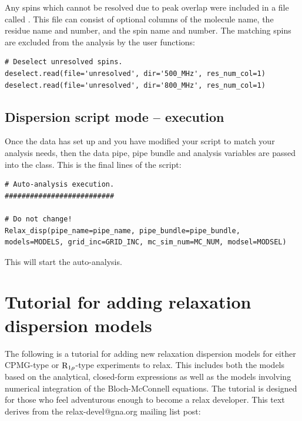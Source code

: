 Any spins which cannot be resolved due to peak overlap were included in a file called .  This file can consist of optional columns of the molecule name, the residue name and number, and the spin name and number.  The matching spins are excluded from the analysis by the user functions:

\begin{lstlisting}[firstnumber=113]
# Deselect unresolved spins.
deselect.read(file='unresolved', dir='500_MHz', res_num_col=1)
deselect.read(file='unresolved', dir='800_MHz', res_num_col=1)
\end{lstlisting}


\subsection{Dispersion script mode -- execution}

Once the data has set up and you have modified your script to match your analysis needs, then the data pipe, pipe bundle and analysis variables are passed into the  class.  This is the final lines of the script:

\begin{lstlisting}[firstnumber=119]
# Auto-analysis execution.
##########################

# Do not change!
Relax_disp(pipe_name=pipe_name, pipe_bundle=pipe_bundle, models=MODELS, grid_inc=GRID_INC, mc_sim_num=MC_NUM, modsel=MODSEL)
\end{lstlisting}

This will start the auto-analysis.




\section{Tutorial for adding relaxation dispersion models}

The following is a tutorial for adding new relaxation dispersion models for either CPMG-type or $\mathrm{R}_{1\rho}$-type experiments to relax.  This includes both the models based on the analytical, closed-form expressions as well as the models involving numerical integration of the Bloch-McConnell equations.  The tutorial is designed for those who feel adventurous enough to become a relax developer.  This text derives from the relax-devel@gna.org mailing list post:

